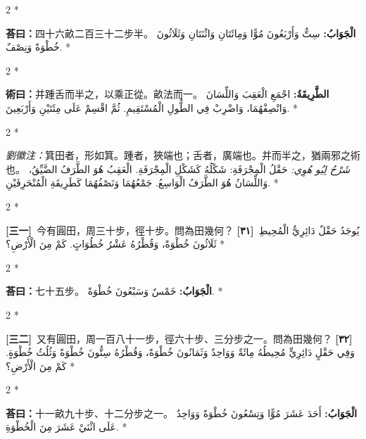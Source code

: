 \documentclass[11pt,a4paper]{article}
\newcommand{\ar}[1]{\arabicfont\beginR #1\endR}
\newcommand{\problemnum}[1]{\textbf{[\ignorespaces#1\unskip]}}
\newenvironment{bilingual}{%
  \begin{paracol}{2}%
  \switchcolumn[0]*%
}{%
  \end{paracol}%
}
\newcommand{\cnline}[1]{\switchcolumn[0]\noindent #1 \switchcolumn[1]}
\newcommand{\arline}[1]{\noindent\ar{#1} \switchcolumn[0]*}
\newenvironment{prob bilingual}{%
  \begin{paracol}{2}%
  \switchcolumn[0]*%
}{%
  \end{paracol}%
  \vspace{0.3em}%
}
\begin{document}
\begin{bilingual}
\cnline{\textcolor{answercolor}{\textbf{荅曰：}}四十六畝二百三十二步半。}
\arline{\textcolor{answercolor}{\textbf{الْجَوَابُ:}} سِتٌّ وَأَرْبَعُونَ مُوًّا وَمِائَتَانِ وَاثْنَتَانِ وَثَلَاثُونَ خُطْوَةً وَنِصْفٌ.}
\end{bilingual}

\begin{bilingual}
\cnline{%
\textcolor{methodcolor}{\textbf{術曰：}}并踵舌而半之，以乘正從。畝法而一。
}
\arline{%
\textcolor{methodcolor}{\textbf{الطَّرِيقَةُ:}} اجْمَعِ الْعَقِبَ وَاللِّسَانَ وَانْصِفْهُمَا، وَاضْرِبْ فِي الطُّولِ الْمُسْتَقِيمِ. ثُمَّ اقْسِمْ عَلَى مِئَتَيْنِ وَأَرْبَعِينَ.
}
\end{bilingual}

\begin{bilingual}
\cnline{%
\textcolor{commentarycolor}{\small\textit{劉徽注：}}箕田者，形如箕。踵者，狹端也；舌者，廣端也。并而半之，猶兩邪之術也。
}
\arline{%
\textcolor{commentarycolor}{\small\textit{شَرْحُ لِيُو هُوِي:}} حَقْلُ الْمِجْرَفَةِ: شَكْلُهُ كَشَكْلِ الْمِجْرَفَةِ. الْعَقِبُ هُوَ الطَّرَفُ الضَّيِّقُ، وَاللِّسَانُ هُوَ الطَّرَفُ الْوَاسِعُ. جَمْعُهُمَا وَنَصْفُهُمَا كَطَرِيقَةِ الْمُنْحَرِفَيْنِ.
}
\end{bilingual}


\begin{bilingual}
\cnline{\problemnum{三一}\, 今有圓田，周三十步，徑十步。問為田幾何？}
\arline{\problemnum{٣١}\, يُوجَدُ حَقْلٌ دَائِرِيُّ الْمُحِيطِ ثَلَاثُونَ خُطْوَةً، وَقُطْرُهُ عَشْرُ خُطُوَاتٍ. كَمْ مِنَ الْأَرْضِ؟}
\end{bilingual}

\begin{bilingual}
\cnline{\textcolor{answercolor}{\textbf{荅曰：}}七十五步。}
\arline{\textcolor{answercolor}{\textbf{الْجَوَابُ:}} خَمْسٌ وَسَبْعُونَ خُطْوَةً.}
\end{bilingual}

\begin{bilingual}
\cnline{\problemnum{三二}\, 又有圓田，周一百八十一步，徑六十步、三分步之一。問為田幾何？}
\arline{\problemnum{٣٢}\, وَفِي حَقْلٍ دَائِرِيٍّ مُحِيطُهُ مِائَةٌ وَوَاحِدٌ وَثَمَانُونَ خُطْوَةً، وَقُطْرُهُ سِتُّونَ خُطْوَةً وَثُلُثُ خُطْوَةٍ. كَمْ مِنَ الْأَرْضِ؟}
\end{bilingual}

\begin{bilingual}
\cnline{\textcolor{answercolor}{\textbf{荅曰：}}十一畝九十步、十二分步之一。}
\arline{\textcolor{answercolor}{\textbf{الْجَوَابُ:}} أَحَدَ عَشَرَ مُوًّا وَتِسْعُونَ خُطْوَةً وَوَاحِدٌ عَلَى اثْنَيْ عَشَرَ مِنَ الْخُطْوَةِ.}
\end{bilingual}
\end{document}

